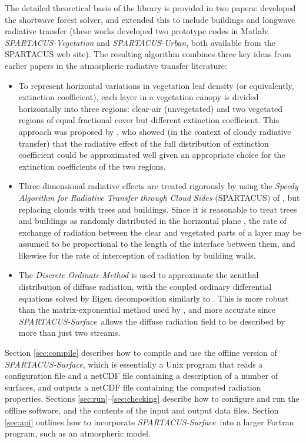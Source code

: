 \documentclass[a4,oneside]{article}
\def\spsurf{\emph{SPARTACUS-Surface}}
\begin{document}
The detailed theoretical basis of the library is provided in two
papers: \cite{Hogan+2018} developed the shortwave forest solver, and
\cite{Hogan2019b} extended this to include buildings and longwave
radiative transfer (these works developed two prototype codes in
Matlab: \emph{SPARTACUS-Vegetation} and \emph{SPARTACUS-Urban}, both
available from the SPARTACUS web site).  The resulting algorithm
combines three key ideas from earlier papers in the atmospheric
radiative transfer literature:
%
\begin{itemize}
\item To represent horizontal variations in vegetation leaf density
  (or equivalently, extinction coefficient), each layer in a
  vegetation canopy is divided horizontally into three regions:
  clear-air (unvegetated) and two vegetated regions of equal
  fractional cover but different extinction coefficient.  This
  approach was proposed by \cite{Shonk+2008}, who showed (in the
  context of cloudy radiative transfer) that the radiative effect of
  the full distribution of extinction coefficient could be
  approximated well given an appropriate choice for the extinction
  coefficients of the two regions.
\item Three-dimensional radiative effects are treated rigorously by
  using the \emph{Speedy Algorithm for Radiative Transfer through
    Cloud Sides} (SPARTACUS) of \cite{Hogan+2016}, but replacing
  clouds with trees and buildings.  Since it is reasonable to treat
  trees and buildings as randomly distributed in the horizontal plane
  \cite[see also][]{Hogan2019a}, the rate of exchange of radiation
  between the clear and vegetated parts of a layer may be assumed to
  be proportional to the length of the interface between them, and
  likewise for the rate of interception of radiation by building
  walls.
\item The \emph{Discrete Ordinate Method} is used to approximate the
  zenithal distribution of diffuse radiation, with the coupled
  ordinary differential equations solved by Eigen decomposition
  similarly to \cite{Stamnes+1988}. This is more robust than the
  matrix-exponential method used by \cite{Hogan+2016}, and more
  accurate since \spsurf\ allows the diffuse radiation field to be
  described by more than just two streams.
\end{itemize}

Section \ref{sec:compile} describes how to compile and use the offline
version of \spsurf, which is essentially a Unix program that reads a
configuration file and a netCDF file containing a description of a
number of surfaces, and outputs a netCDF file containing the computed
radiation properties. Sections
\ref{sec:run}--\ref{sec:checking} describe how to configure
and run the offline software, and the contents of the input and output
data files.  Section \ref{sec:api} outlines how to incorporate
\spsurf\ into a larger Fortran program, such as an atmospheric model.
\end{document}
